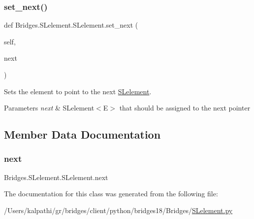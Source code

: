 \subsubsection{\texorpdfstring{set\+\_\+next()}{set\_next()}}
{\footnotesize\ttfamily def Bridges.\+S\+Lelement.\+S\+Lelement.\+set\+\_\+next (\begin{DoxyParamCaption}\item[{}]{self,  }\item[{}]{next }\end{DoxyParamCaption})}



Sets the element to point to the next \mbox{\hyperlink{class_bridges_1_1_s_lelement_1_1_s_lelement}{S\+Lelement}}. 


\begin{DoxyParams}{Parameters}
{\em next} & S\+Lelement$<$\+E$>$ that should be assigned to the next pointer \\
\hline
\end{DoxyParams}


\subsection{Member Data Documentation}
\mbox{\label{class_bridges_1_1_s_lelement_1_1_s_lelement_a650935f5a68b49de4c222cc4c8b0c778}} 
\subsubsection{\texorpdfstring{next}{next}}
{\footnotesize\ttfamily Bridges.\+S\+Lelement.\+S\+Lelement.\+next}



The documentation for this class was generated from the following file\+:\begin{DoxyCompactItemize}
\item 
/\+Users/kalpathi/gr/bridges/client/python/bridges18/\+Bridges/\mbox{\hyperlink{_s_lelement_8py}{S\+Lelement.\+py}}\end{DoxyCompactItemize}

